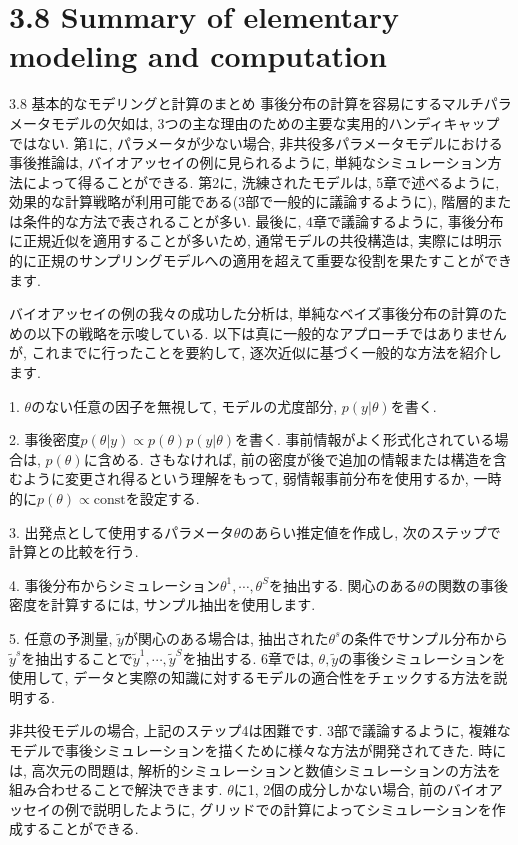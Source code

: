 \documentclass[10pt,dvipdfmx,a4]{beamer}
\begin{document}
\section{3.8 Summary of elementary modeling and computation}
\begin{frame}{3.8 基本的なモデリングと計算のまとめ}
事後分布の計算を容易にするマルチパラメータモデルの欠如は, 3つの主な理由のための主要な実用的ハンディキャップではない.
第1に, パラメータが少ない場合, 非共役多パラメータモデルにおける事後推論は, バイオアッセイの例に見られるように, 単純なシミュレーション方法によって得ることができる.
第2に, 洗練されたモデルは, 5章で述べるように, 効果的な計算戦略が利用可能である(3部で一般的に議論するように), 階層的または条件的な方法で表されることが多い.
最後に, 4章で議論するように, 事後分布に正規近似を適用することが多いため, 通常モデルの共役構造は, 実際には明示的に正規のサンプリングモデルへの適用を超えて重要な役割を果たすことができます.

バイオアッセイの例の我々の成功した分析は, 単純なベイズ事後分布の計算のための以下の戦略を示唆している.
以下は真に一般的なアプローチではありませんが, これまでに行ったことを要約して, 逐次近似に基づく一般的な方法を紹介します.
\end{frame}


\begin{frame}
1. $\theta$のない任意の因子を無視して, モデルの尤度部分, $p(y|\theta)$を書く.

2. 事後密度$p(\theta|y)\propto p(\theta)p(y|\theta)$を書く.
事前情報がよく形式化されている場合は, $p(\theta)$に含める.
さもなければ, 前の密度が後で追加の情報または構造を含むように変更され得るという理解をもって, 弱情報事前分布を使用するか, 一時的に$p(\theta)\propto\text{const}$を設定する.

3. 出発点として使用するパラメータ$\theta$のあらい推定値を作成し, 次のステップで計算との比較を行う.

4. 事後分布からシミュレーション$\theta^1,\cdots, \theta^S$を抽出する.
関心のある$\theta$の関数の事後密度を計算するには, サンプル抽出を使用します.

5. 任意の予測量, $\tilde{y}$が関心のある場合は, 抽出された$\theta^s$の条件でサンプル分布から$\tilde{y}^s$を抽出することで$\tilde{y}^1,\cdots,\tilde{y}^S$を抽出する.
6章では, $\theta, \tilde{y}$の事後シミュレーションを使用して, データと実際の知識に対するモデルの適合性をチェックする方法を説明する.

非共役モデルの場合, 上記のステップ4は困難です.
3部で議論するように, 複雑なモデルで事後シミュレーションを描くために様々な方法が開発されてきた.
時には, 高次元の問題は, 解析的シミュレーションと数値シミュレーションの方法を組み合わせることで解決できます.
$\theta$に1, 2個の成分しかない場合, 前のバイオアッセイの例で説明したように, グリッドでの計算によってシミュレーションを作成することができる.
\end{frame}
\end{document}
